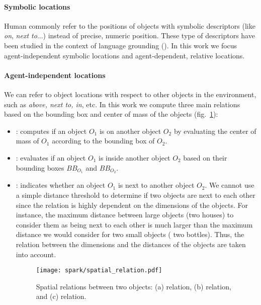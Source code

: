 \paragraph{Symbolic locations}

Human commonly refer to the positions of objects with symbolic descriptors
(like \emph{on}, \emph{next to}...) instead of precise, numeric position. These
type of descriptors have been studied in the context of language grounding
(\cite{O'Keefe1999,Matuszek2010,Regier2001,Kelleher2006,Blisard2005}). In this
work we focus agent-independent symbolic locations and agent-dependent,
relative locations.

\paragraph{Agent-independent locations}

We can refer to object locations with respect to other objects in the
environment, such as \emph{above, next to, in}, etc. In this work we compute
three main relations based on the bounding box and center of mass of the
objects (fig.~\ref{fig|sprelations}): 

\begin{itemize}
	\item {}: computes if an object $O_1$ is on another object $O_2$ by
	evaluating the center of mass of $O_1$ according to the bounding box of $O_2$.

	\item {}: evaluates if an object $O_1$ is inside another object
	$O_2$ based on their bounding boxes $BB_{O_1}$ and $BB_{O_2}$.

	\item {}: indicates whether an object $O_1$ is next to another
	object $O_2$. We cannot use a simple distance threshold to determine if two
	objects are next to each other since the relation is highly dependent on the
	dimensions of the objects. For instance, the maximum distance between large
	objects (\eg two houses) to consider them as being next to each other is much
	larger than the maximum distance we would consider for two small objects (\eg
	two bottles). Thus, the relation between the dimensions and the distances of
	the objects are taken into account.  

\begin{figure} 
	\centering
	\texttt{[image: spark/spatial\_relation.pdf]}
	\caption{Spatial relations between two objects: (a)  relation, 
	(b)  relation, and (c)  relation.} 
	\label{fig|sprelations} 
\end{figure}

\end{itemize} 

